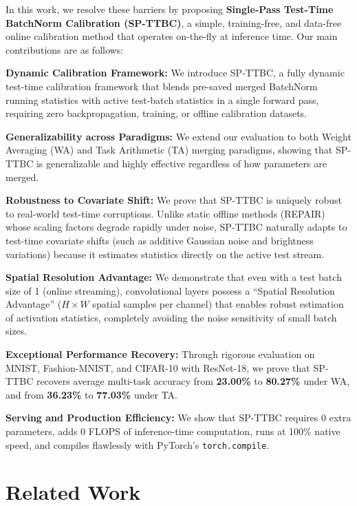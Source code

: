 \documentclass{article}
\theoremstyle{plain}
\theoremstyle{definition}
\theoremstyle{remark}
\begin{document}
In this work, we resolve these barriers by proposing \textbf{Single-Pass Test-Time BatchNorm Calibration (SP-TTBC)}, a simple, training-free, and data-free online calibration method that operates on-the-fly at inference time. Our main contributions are as follows:

\textbf{Dynamic Calibration Framework:} We introduce SP-TTBC, a fully dynamic test-time calibration framework that blends pre-saved merged BatchNorm running statistics with active test-batch statistics in a single forward pass, requiring zero backpropagation, training, or offline calibration datasets.

\textbf{Generalizability across Paradigms:} We extend our evaluation to both Weight Averaging (WA) and Task Arithmetic (TA) merging paradigms, showing that SP-TTBC is generalizable and highly effective regardless of how parameters are merged.

\textbf{Robustness to Covariate Shift:} We prove that SP-TTBC is uniquely robust to real-world test-time corruptions. Unlike static offline methods (REPAIR) whose scaling factors degrade rapidly under noise, SP-TTBC naturally adapts to test-time covariate shifts (such as additive Gaussian noise and brightness variations) because it estimates statistics directly on the active test stream.

\textbf{Spatial Resolution Advantage:} We demonstrate that even with a test batch size of 1 (online streaming), convolutional layers possess a ``Spatial Resolution Advantage'' ($H \times W$ spatial samples per channel) that enables robust estimation of activation statistics, completely avoiding the noise sensitivity of small batch sizes.

\textbf{Exceptional Performance Recovery:} Through rigorous evaluation on MNIST, Fashion-MNIST, and CIFAR-10 with ResNet-18, we prove that SP-TTBC recovers average multi-task accuracy from \textbf{23.00\%} to \textbf{80.27\%} under WA, and from \textbf{36.23\%} to \textbf{77.03\%} under TA.

\textbf{Serving and Production Efficiency:} We show that SP-TTBC requires 0 extra parameters, adds 0 FLOPS of inference-time computation, runs at 100\% native speed, and compiles flawlessly with PyTorch's \texttt{torch.compile}.

\section{Related Work}
\label{related_work}
\end{document}
